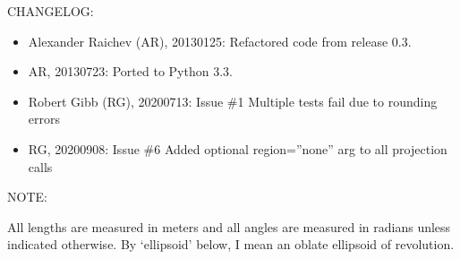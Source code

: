 \documentclass[a4paper,12ptopenany,oneside,english]{sphinxmanual}
\begin{document}
\sphinxAtStartPar
CHANGELOG:
\begin{itemize}
\item {} 
\sphinxAtStartPar
Alexander Raichev (AR), 2013\sphinxhyphen{}01\sphinxhyphen{}25: Refactored code from release 0.3.

\item {} 
\sphinxAtStartPar
AR, 2013\sphinxhyphen{}07\sphinxhyphen{}23: Ported to Python 3.3.

\item {} 
\sphinxAtStartPar
Robert Gibb (RG), 2020\sphinxhyphen{}07\sphinxhyphen{}13: Issue \#1 Multiple tests fail due to rounding errors

\item {} 
\sphinxAtStartPar
RG, 2020\sphinxhyphen{}09\sphinxhyphen{}08: Issue \#6 Added optional region=”none” arg to all projection calls

\end{itemize}

\sphinxAtStartPar
NOTE:

\sphinxAtStartPar
All lengths are measured in meters and all angles are measured in radians
unless indicated otherwise.
By ‘ellipsoid’ below, I mean an oblate ellipsoid of revolution.
\end{document}
